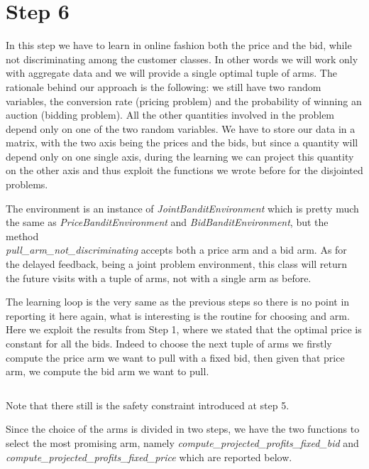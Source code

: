 \documentclass[11pt]{article} %
\begin{document}
\clearpage

{\footnotesize}



\clearpage
\section{Step 6}
In this step we have to learn in online fashion both the price and the bid, while not discriminating among the customer
classes. In other words we will work only with aggregate data and we will provide a single optimal tuple of arms.
The rationale behind our approach is the following: we still have two random variables, the conversion rate (pricing
problem) and the probability of winning an auction (bidding problem). All the other quantities involved in the problem
depend only on one of the two random variables. We have to store our data in a matrix, with the two axis being the prices
and the bids, but since a quantity will depend only on one single axis, during the learning we can project this quantity
on the other axis and thus exploit the functions we wrote before for the disjointed problems.

The environment is an instance of \textit{JointBanditEnvironment} which is pretty much the same as \textit{PriceBanditEnvironment}
and \textit{BidBanditEnvironment}, but the method \\ \textit{pull\_arm\_not\_discriminating} accepts both a price arm and a
bid arm.
As for the delayed feedback, being a joint problem environment, this class will return the future visits with a tuple of
arms, not with a single arm as before.

The learning loop is the very same as the previous steps so there is no point in reporting it here again, what is
interesting is the routine for choosing and arm. Here we exploit the results from Step 1, where we stated that the optimal
price is constant for all the bids. Indeed to choose the next tuple of arms we firstly compute the price arm we want to
pull with a fixed bid, then given that price arm, we compute the bid arm we want to pull.
\inputminted{python}{code/step6_choose_arm.py}
Note that there still is the safety constraint introduced at step 5.

Since the choice of the arms is divided in two steps, we have the two functions to select the most promising arm, namely
\textit{compute\_projected\_profits\_fixed\_bid} and \textit{compute\_projected\_profits\_fixed\_price} which are reported below.
\inputminted{python}{code/step6_expected_price_fixed_bid.py}
\inputminted{python}{code/step6_expected_price_fixed_price.py}
\end{document}

